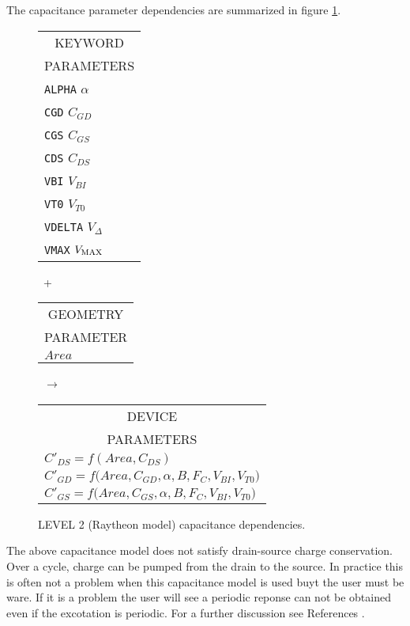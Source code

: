 The capacitance parameter dependencies are summarized in figure
\ref{blevel2cap}.
\begin{figure}[h]
\begin{tabular}[t]{|p{1in}|}
\hline
\multicolumn{1}{|c|}{KEYWORD} \\
\multicolumn{1}{|c|}{PARAMETERS} \\
\hline
\hline
{\tt ALPHA} \hfill $\alpha$\\
{\tt CGD} \hfill $C_{GD}$\\
{\tt CGS} \hfill $C_{GS}$\\
{\tt CDS} \hfill $C_{DS}$\\
{\tt VBI} \hfill $V_{BI}$\\
{\tt VT0} \hfill $V_{T0}$\\
{\tt VDELTA} \hfill $V_{\Delta}$\\
{\tt VMAX} \hfill $V_{\mbox{\scriptsize MAX}}$\\
\hline
\end{tabular}
\hfill
\parbox{0.2in}{\ \vspace*{0.2in}\newline +}
\hfill
\begin{tabular}[t]{|p{1in}|}
\hline
\multicolumn{1}{|c|}{GEOMETRY} \\
\multicolumn{1}{|c|}{PARAMETER} \\
\hline
\hspace*{\fill}$Area$\\
\hline
\end{tabular}
\hfill
\parbox{0.2in}{\ \vspace*{0.2in}\newline $\rightarrow$}
\hfill
\begin{tabular}[t]{|p{1.8in}|}
\hline
\multicolumn{1}{|c|}{DEVICE} \\
\multicolumn{1}{|c|}{PARAMETERS} \\
\hline
$C'_{DS} = f(Area, C_{DS})$\\
$C'_{GD} = f(Area, C_{GD}, \alpha,$\newline\hspace*{\fill}$ B, F_C, V_{BI}, V_{T0})$\\
$C'_{GS} = f(Area, C_{GS}, \alpha,$\newline\hspace*{\fill}$ B, F_C, V_{BI},
V_{T0})$\\
\hline
\end{tabular}
\caption{LEVEL 2 (Raytheon model) capacitance dependencies. \label{blevel2cap}}
\end{figure}
The above capacitance model does not satisfy drain-source charge
conservation.  Over a cycle, charge can be pumped from the drain to the
source.  In practice this is often not a problem when this capacitance model
is used buyt the user must be ware.  If it is a problem the user will see a
periodic reponse can not be obtained even if the excotation is periodic.
For a further discussion see References \cite{divekar:87,smith:87}.

